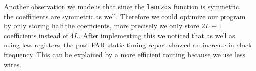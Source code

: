 Another observation we made is that since the \texttt{lanczos} function is symmetric, the coefficients are symmetric as well. Therefore we could optimize our program by only storing half the coefficients, more precisely we only store $2L + 1$ coefficients instead of $4L$. After implementing this we noticed that as well as using less registers, the post PAR static timing report showed an increase in clock frequency. This can be explained by a more efficient routing because we use less wires.
